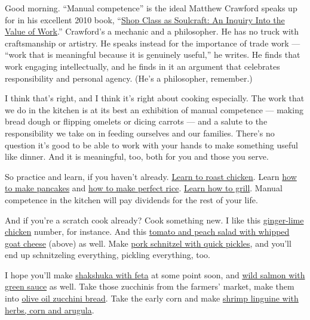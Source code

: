 Good morning. ``Manual competence'' is the ideal Matthew Crawford speaks
up for in his excellent 2010 book,
``\href{https://www.penguinrandomhouse.com/books/301618/shop-class-as-soulcraft-by-matthew-b-crawford/}{Shop
Class as Soulcraft: An Inquiry Into the Value of Work}.'' Crawford's a
mechanic and a philosopher. He has no truck with craftsmanship or
artistry. He speaks instead for the importance of trade work --- ``work
that is meaningful because it is genuinely useful,'' he writes. He finds
that work engaging intellectually, and he finds in it an argument that
celebrates responsibility and personal agency. (He's a philosopher,
remember.)

I think that's right, and I think it's right about cooking especially.
The work that we do in the kitchen is at its best an exhibition of
manual competence --- making bread dough or flipping omelets or dicing
carrots --- and a salute to the responsibility we take on in feeding
ourselves and our families. There's no question it's good to be able to
work with your hands to make something useful like dinner. And it is
meaningful, too, both for you and those you serve.

So practice and learn, if you haven't already.
\href{https://cooking.nytimes.com/guides/11-how-to-roast-chicken}{Learn
to roast chicken}. Learn
\href{https://cooking.nytimes.com/guides/24-how-to-make-pancakes}{how to
make pancakes} and
\href{https://cooking.nytimes.com/guides/49-how-to-make-rice}{how to
make perfect rice}.
\href{https://cooking.nytimes.com/guides/7-how-to-grill}{Learn how to
grill}. Manual competence in the kitchen will pay dividends for the rest
of your life.

And if you're a scratch cook already? Cook something new. I like this
\href{https://cooking.nytimes.com/recipes/1021294-ginger-lime-chicken}{ginger-lime
chicken} number, for instance. And this
\href{https://cooking.nytimes.com/recipes/1020367-tomato-and-peach-salad-with-whipped-goat-cheese}{tomato
and peach salad with whipped goat cheese} (above) as well. Make
\href{https://cooking.nytimes.com/recipes/1016866-pork-schnitzel-with-quick-pickles}{pork
schnitzel with quick pickles}, and you'll end up schnitzeling
everything, pickling everything, too.

I hope you'll make
\href{https://cooking.nytimes.com/recipes/1014721-shakshuka-with-feta}{shakshuka
with feta} at some point soon, and
\href{https://cooking.nytimes.com/recipes/1014868-wild-salmon-with-green-sauce}{wild
salmon with green sauce} as well. Take those zucchinis from the farmers'
market, make them into
\href{https://cooking.nytimes.com/recipes/1017522-olive-oil-zucchini-bread}{olive
oil zucchini bread}. Take the early corn and make
\href{https://cooking.nytimes.com/recipes/1020354-shrimp-linguine-with-herbs-corn-and-arugula}{shrimp
linguine with herbs, corn and arugula}.


